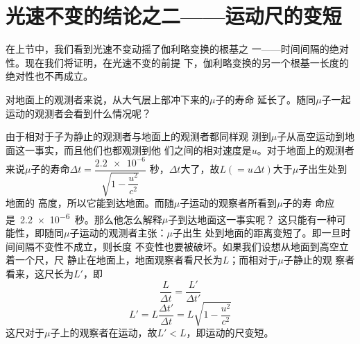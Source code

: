\section{光速不变的结论之二——运动尺的变短}\label{sec:02.08}

在上节中，我们看到光速不变动摇了伽利略变换的根基之
一——时间间隔的绝对性。现在我们将证明，在光速不变的前提
下，伽利略变换的另一个根基一长度的绝对性也不再成立。

对地面上的观测者来说，从大气层上部冲下来的$ \mu $子的寿命
延长了。随同$ \mu $子一起运动的观测者会看到什么情况呢？

由于相对于子为静止的观测者与地面上的观测者都同样观
测到$ \mu $子从高空运动到地面这一事实，而且他们也都观测到他
们之间的相对速度是$u$。对于地面上的观测者来说$\mu$子的寿命$\Delta t = \dfrac{\num{2.2e-6}}{\sqrt{1 - \dfrac{u ^ 2}{c ^ 2}}}$
秒，$\Delta t$大了，故$ L \left( = u \Delta t \right)$大于$\mu$子出生处到地面的
高度，所以它能到达地面。而随$\mu$子运动的观察者所看到$\mu$子的寿
命应是~\num{2.2e-6}~秒。那么他怎么解释$\mu$子到达地面这一事实呢？
这只能有一种可能性，即随同$\mu$子运动的观测者主张：$\mu$子出生
处到地面的距离变短了。即一旦时间间隔不变性不成立，则长度
不变性也要被破坏。如果我们设想从地面到高空立着一个尺，尺
静止在地面上，地面观察者看尺长为$L$；而相对于$\mu$子静止的观
察者看来，这尺长为$L'$，即
\begin{equation*}
  \frac { L } { \Delta t } = \frac { L ' } { \Delta t ' }
\end{equation*}
\begin{equation}\label{eqn:02.08.01}
  L ' = L \frac { \Delta t ' } { \Delta t } = L \sqrt { 1 - \frac { u ^ { 2 } }  { c ^ { 2 } } }
\end{equation}
这尺对于$\mu$子上的观察者在运动，故$ L ' < L  $，即运动的尺变短。


